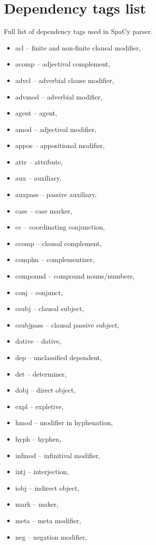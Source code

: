 \chapter{Dependency tags list}
\label{cha:dependencies-list}
Full list of dependency tags used in SpaCy parser.
\begin{itemize}
	\item acl -- finite and non-finite clausal modifier,
	\item acomp -- adjectival complement,
	\item advcl -- adverbial clause modifier,
	\item advmod -- adverbial modifier,
	\item agent -- agent,
	\item amod -- adjectival modifier,
	\item appos -- appositional modifier,
	\item attr -- attribute,
	\item aux -- auxiliary,
	\item auxpass -- passive auxiliary,
	\item case -- case marker,
	\item cc -- coordinating conjunction,
	\item ccomp -- clausal complement,
	\item complm -- complementizer,
	\item compound -- compound nouns/numbers,
	\item conj -- conjunct,
	\item csubj -- clausal subject,
	\item csubjpass -- clausal passive subject,
	\item dative -- dative,
	\item dep -- unclassified dependent,
	\item det -- determiner,
	\item dobj -- direct object,
	\item expl -- expletive,
	\item hmod -- modifier in hyphenation,
	\item hyph -- hyphen,
	\item infmod -- infinitival modifier,
	\item intj -- interjection,
	\item iobj -- indirect object,
	\item mark -- maker,
	\item meta -- meta modifier,
	\item neg -- negation modifier,

\end{itemize}
